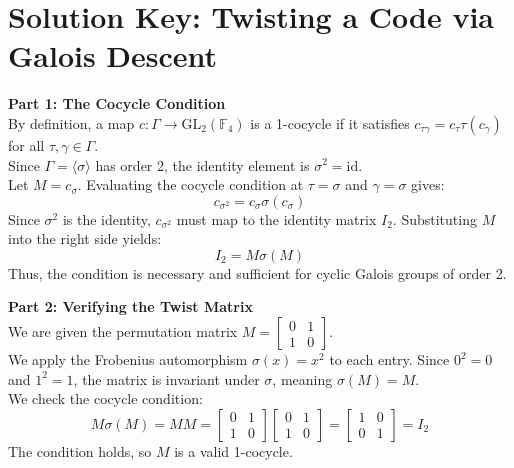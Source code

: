 \documentclass[11pt, a4paper, twoside]{article}
\newcommand{\F}{\mathbb{F}}
\begin{document}
	\section*{Solution Key: Twisting a Code via Galois Descent}
	
		\textbf{Part 1: The Cocycle Condition}\\
		By definition, a map $c: \Gamma \to \text{GL}_2(\F_4)$ is a 1-cocycle if it satisfies $c_{\tau \gamma} = c_\tau \tau(c_\gamma)$ for all $\tau, \gamma \in \Gamma$. \\
		Since $\Gamma = \langle \sigma \rangle$ has order 2, the identity element is $\sigma^2 = \text{id}$. \\
		Let $M = c_\sigma$. Evaluating the cocycle condition at $\tau = \sigma$ and $\gamma = \sigma$ gives:
		$$ c_{\sigma^2} = c_\sigma \sigma(c_\sigma) $$
		Since $\sigma^2$ is the identity, $c_{\sigma^2}$ must map to the identity matrix $I_2$. Substituting $M$ into the right side yields:
		$$ I_2 = M \sigma(M) $$
		Thus, the condition is necessary and sufficient for cyclic Galois groups of order 2.
		
		\vspace{1em}
		\textbf{Part 2: Verifying the Twist Matrix}\\
		We are given the permutation matrix $M = \begin{bmatrix} 0 & 1 \\ 1 & 0 \end{bmatrix}$. \\
		We apply the Frobenius automorphism $\sigma(x) = x^2$ to each entry. Since $0^2 = 0$ and $1^2 = 1$, the matrix is invariant under $\sigma$, meaning $\sigma(M) = M$. \\
		We check the cocycle condition:
		$$ M \sigma(M) = M M = \begin{bmatrix} 0 & 1 \\ 1 & 0 \end{bmatrix} \begin{bmatrix} 0 & 1 \\ 1 & 0 \end{bmatrix} = \begin{bmatrix} 1 & 0 \\ 0 & 1 \end{bmatrix} = I_2 $$
		The condition holds, so $M$ is a valid 1-cocycle.
		
\end{document}
